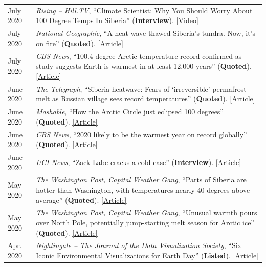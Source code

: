 \documentclass[margin,line,palatino,courier,10pt]{res}
\begin{document}
\begin{resume}
\begin{tabular}{@{}p{0.9in}p{4in}}
July 2020 & \textit{Rising -- Hill.TV}, ``Climate Scientist: Why You Should Worry About 100 Degree Temps In Siberia'' (\textbf{Interview}). \href{https://www.youtube.com/watch?v=fw4fG-_aI28&feature=youtu.be}{[Video]}\\
July 2020 & \textit{National Geographic}, ``A heat wave thawed Siberia’s tundra. Now, it’s on fire'' (\textbf{Quoted}). \href{https://www.nationalgeographic.com/science/2020/07/heat-wave-thawed-siberia-now-on-fire/#close}{[Article]}\\
July 2020 & \textit{CBS News}, ``100.4 degree Arctic temperature record confirmed as study suggests Earth is warmest in at least 12,000 years'' (\textbf{Quoted}). \href{https://www.cbsnews.com/news/arctic-temperature-record-100-4-degrees-earth-warmest-12000-years/}{[Article]}\\
June 2020 & \textit{The Telegraph}, ``Siberia heatwave: Fears of `irreversible' permafrost melt as Russian village sees record temperatures'' (\textbf{Quoted}). \href{https://www.telegraph.co.uk/news/2020/06/26/siberia-heatwave-fears-irreversible-permafrost-meltas-russian/}{[Article]}\\
June 2020 & \textit{Mashable}, ``How the Arctic Circle just eclipsed 100 degrees'' (\textbf{Quoted}). \href{https://mashable.com/article/arctic-heat-100-degrees/}{[Article]}\\
June 2020 & \textit{CBS News}, ``2020 likely to be the warmest year on record globally'' (\textbf{Quoted}). \href{https://www.cbsnews.com/news/warmest-year-on-record-2020-likely/}{[Article]}\\
June 2020 & \textit{UCI News}, ``Zack Labe cracks a cold case'' (\textbf{Interview}). \href{https://medium.com/@UCISoPS/zack-labe-cracks-a-cold-case-6e8793248e9d}{[Article]}\\
May 2020 & \textit{The Washington Post, Capital Weather Gang}, ``Parts of Siberia are hotter than Washington, with temperatures nearly 40 degrees above average'' (\textbf{Quoted}). \href{https://www.washingtonpost.com/weather/2020/05/22/siberia-heat-wave/}{[Article]}\\
May 2020 & \textit{The Washington Post, Capital Weather Gang}, ``Unusual warmth pours over North Pole, potentially jump-starting melt season for Arctic ice'' (\textbf{Quoted}). \href{https://www.washingtonpost.com/weather/2020/05/14/arctic-temperature-spike-sea-ice/}{[Article]}\\
Apr. 2020 & \textit{Nightingale – The Journal of the Data Visualization Society}, ``Six Iconic Environmental Visualizations for Earth Day'' (\textbf{Listed}). \href{https://medium.com/nightingale/six-iconic-environmental-visualizations-for-earth-day-d7a5bdaf177b}{[Article]}\\

\end{tabular}
\end{resume}
\end{document}
